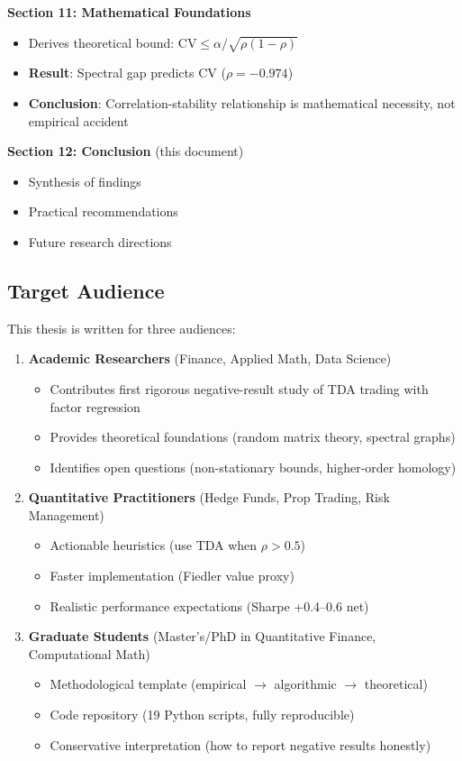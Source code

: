 \textbf{Section 11: Mathematical Foundations}
\begin{itemize}
\item Derives theoretical bound: $\text{CV} \leq \alpha/\sqrt{\rho(1-\rho)}$
\item \textbf{Result}: Spectral gap predicts CV ($\rho = -0.974$)
\item \textbf{Conclusion}: Correlation-stability relationship is mathematical necessity, not empirical accident
\end{itemize}

\textbf{Section 12: Conclusion} (this document)
\begin{itemize}
\item Synthesis of findings
\item Practical recommendations
\item Future research directions
\end{itemize}

\subsection{Target Audience}

This thesis is written for three audiences:

\begin{enumerate}
\item \textbf{Academic Researchers} (Finance, Applied Math, Data Science)
   \begin{itemize}
   \item Contributes first rigorous negative-result study of TDA trading with factor regression
   \item Provides theoretical foundations (random matrix theory, spectral graphs)
   \item Identifies open questions (non-stationary bounds, higher-order homology)
   \end{itemize}

\item \textbf{Quantitative Practitioners} (Hedge Funds, Prop Trading, Risk Management)
   \begin{itemize}
   \item Actionable heuristics (use TDA when $\rho > 0.5$)
   \item Faster implementation (Fiedler value proxy)
   \item Realistic performance expectations (Sharpe +0.4--0.6 net)
   \end{itemize}

\item \textbf{Graduate Students} (Master's/PhD in Quantitative Finance, Computational Math)
   \begin{itemize}
   \item Methodological template (empirical $\rightarrow$ algorithmic $\rightarrow$ theoretical)
   \item Code repository (19 Python scripts, fully reproducible)
   \item Conservative interpretation (how to report negative results honestly)
   \end{itemize}
\end{enumerate}

